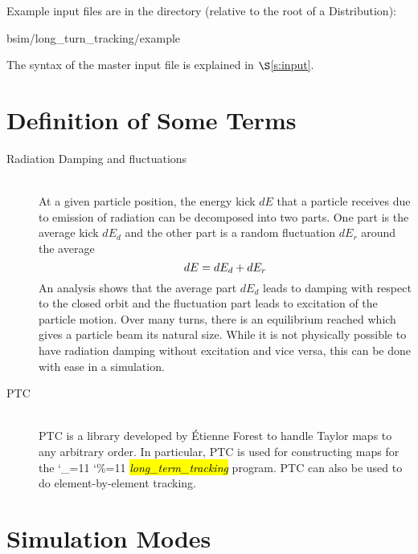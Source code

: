 \documentclass{hitec}
\newcommand\dottcmd[1]{\hl{\em#1}\endgroup}
\newcommand{\vn}{\begingroup\catcode`\_=11 \catcode`\%=11 \dottcmd}
\newcommand{\Newline}{\hfil \\}
\newcommand{\sref}[1]{$\S$\ref{#1}}
\newcommand{\Section}[1]{\section{#1}\vspace*{-1ex}}
\begin{document}
Example input files are in the directory (relative to the root of a Distribution):
\begin{code}
  bsim/long_turn_tracking/example
\end{code}

The syntax of the master input file is explained in \sref{s:input}.

\Section{Definition of Some Terms}
\label{s:def}

\begin{description}
\item[Radiation Damping and fluctuations] \Newline
At a given particle position, the energy kick $dE$ that a particle receives due to emission of
radiation can be decomposed into two parts. One part is the average kick $dE_d$ and the other part
is a random fluctuation $dE_r$ around the average 
\begin{equation}\large
  dE = dE_d + dE_r
\end{equation}
An analysis shows that the average part $dE_d$ leads to damping with respect to the closed orbit and
the fluctuation part leads to excitation of the particle motion. Over many turns, there is an
equilibrium reached which gives a particle beam its natural size. While it is not physically
possible to have radiation damping without excitation and vice versa, this can be done with ease in
a simulation.

\item[PTC] \Newline
PTC is a library developed by \'Etienne Forest to handle Taylor maps to any arbitrary order. In
particular, PTC is used for constructing maps for the \vn{long_term_tracking} program. PTC can also
be used to do element-by-element tracking.
\end{description}

\Section{Simulation Modes}
\label{s:sim.modes}
\end{document}
